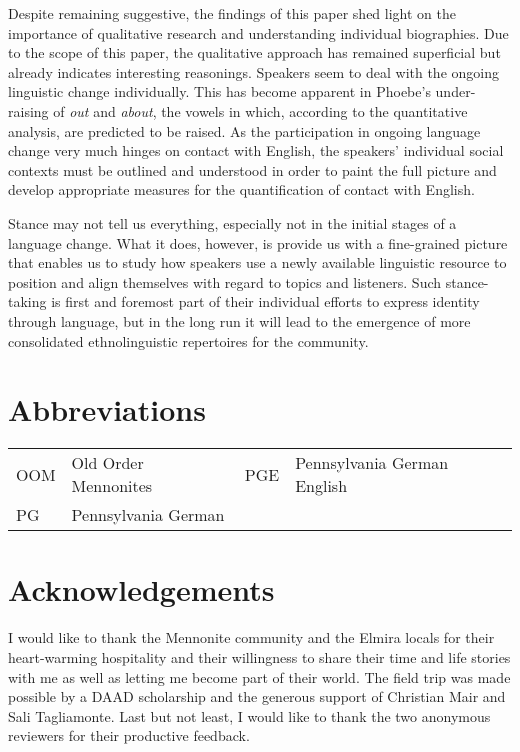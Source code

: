 \documentclass[output=paper]{langscibook}
\begin{document}
Despite remaining suggestive, the findings of this paper shed light on the importance of qualitative research and understanding individual biographies. Due to the scope of this paper, the qualitative approach has remained superficial but already indicates interesting reasonings. Speakers seem to deal with the ongoing linguistic change individually. This has become apparent in Phoebe’s under-raising of \textit{out} and \textit{about}, the vowels in which, according to the quantitative analysis, are predicted to be raised. As the participation in ongoing language change very much hinges on contact with English, the speakers’ individual social contexts must be outlined and understood in order to paint the full picture and develop appropriate measures for the quantification of contact with English. 

Stance may not tell us everything, especially not in the initial stages of a language change. What it does, however, is provide us with a fine-grained picture that enables us to study how speakers use a newly available linguistic resource to position and align themselves with regard to topics and listeners. Such stance-taking is first and foremost part of their individual efforts to express identity through language, but in the long run it will lead to the emergence of more consolidated ethnolinguistic repertoires for the community.


\section*{Abbreviations}
\begin{tabularx}{\textwidth}{ll@{\qquad}ll}
OOM& Old Order Mennonites & PGE&Pennsylvania German English \\
PG&Pennsylvania German\\
\end{tabularx}


\section*{Acknowledgements}
I would like to thank the Mennonite community and the Elmira locals for their heart-warming hospitality and their willingness to share their time and life stories with me as well as letting me become part of their world. The field trip was made possible by a DAAD scholarship and the generous support of Christian Mair and Sali Tagliamonte. Last but not least, I would like to thank the two anonymous reviewers for their productive feedback.



\printbibliography[heading=subbibliography, notkeyword=this]
\end{document}
